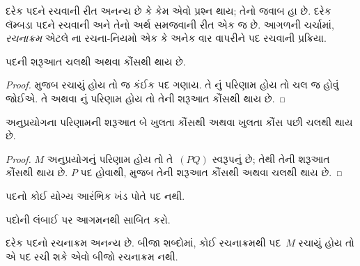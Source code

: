\begingroup
\makeatletter{}\makeatother

\label{guunit:OLP-0358}


દરેક પદને રચવાની રીત અનન્ય છે કે કેમ એવો પ્રશ્ન થાય; તેનો
જવાબ હા છે. દરેક લૅમ્બડા પદને રચવાની અને તેનો અર્થ સમજવાની
રીત એક જ છે. આગળની ચર્ચામાં, \emph{રચનાક્રમ} એટલે
ના રચના-નિયમો એક કે અનેક વાર વાપરીને
પદ રચવાની પ્રક્રિયા.

\begin{lem}
પદની શરૂઆત ચલથી અથવા કૌંસથી થાય છે.
\end{lem}

\begin{proof}
 મુજબ રચાયું હોય તો જ કંઈક પદ ગણાય.
તે નું પરિણામ હોય તો ચલ જ હોવું જોઈએ.
તે  અથવા
નું પરિણામ હોય તો તેની શરૂઆત કૌંસથી
થાય છે.
\end{proof}

\begin{lem}
અનુપ્રયોગના પરિણામની શરૂઆત બે ખુલતા કૌંસથી અથવા ખુલતા કૌંસ
પછી ચલથી થાય છે.
\end{lem}

\begin{proof}
$M$ અનુપ્રયોગનું પરિણામ હોય તો તે~$(PQ)$ સ્વરૂપનું છે;
તેથી તેની શરૂઆત કૌંસથી થાય છે. $P$ પદ હોવાથી,
 મુજબ તેની શરૂઆત કૌંસથી અથવા ચલથી
થાય છે.
\end{proof}

\begin{lem}
પદનો કોઈ યોગ્ય આરંભિક ખંડ પોતે પદ નથી.
\end{lem}

\begin{prob}
પદોની લંબાઈ પર આગમનથી
 સાબિત કરો.
\end{prob}

\begin{prop}[અનન્ય વાંચનીયતા] 
દરેક પદનો રચનાક્રમ અનન્ય છે. બીજા શબ્દોમાં, કોઈ રચનાક્રમથી
પદ~$M$ રચાયું હોય તો એ પદ રચી શકે એવો બીજો રચનાક્રમ નથી.
\end{prop}

